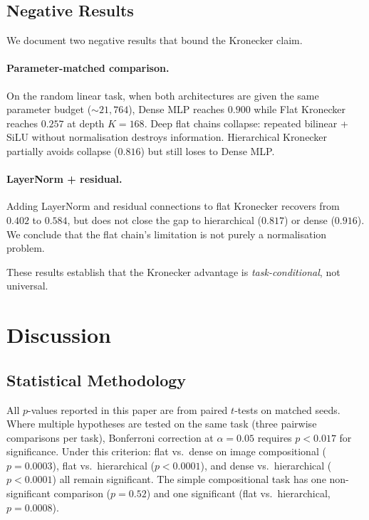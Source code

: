 \documentclass[11pt,a4paper]{article}
\begin{document}
\subsection{Negative Results}
\label{sec:negatives}

We document two negative results that bound the Kronecker claim.

\paragraph{Parameter-matched comparison.}
On the random linear task, when both architectures are given the same
parameter budget ($\sim 21{,}764$), Dense MLP reaches $0.900$ while
Flat Kronecker reaches $0.257$ at depth $K=168$. Deep flat chains
collapse: repeated bilinear + SiLU without normalisation destroys
information. Hierarchical Kronecker partially avoids collapse
($0.816$) but still loses to Dense MLP.

\paragraph{LayerNorm + residual.}
Adding LayerNorm and residual connections to flat Kronecker recovers
from $0.402$ to $0.584$, but does not close the gap to hierarchical
($0.817$) or dense ($0.916$). We conclude that the flat chain's
limitation is not purely a normalisation problem.

These results establish that the Kronecker advantage is
\emph{task-conditional}, not universal.


\section{Discussion}
\label{sec:discussion}

\subsection{Statistical Methodology}
\label{sec:stats}

All $p$-values reported in this paper are from paired $t$-tests on
matched seeds. Where multiple hypotheses are tested on the same task
(three pairwise comparisons per task), Bonferroni correction at
$\alpha = 0.05$ requires $p < 0.017$ for significance. Under this
criterion: flat vs.\ dense on image compositional
($p = 0.0003$), flat vs.\ hierarchical ($p < 0.0001$), and dense
vs.\ hierarchical ($p < 0.0001$) all remain significant. The
simple compositional task has one non-significant comparison
($p = 0.52$) and one significant (flat vs.\ hierarchical,
$p = 0.0008$).
\end{document}
